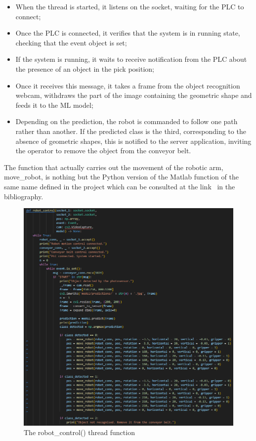 \documentclass[a4paper,11pt]{report}
\theoremstyle{definition}
\theoremstyle{plain}
\begin{document}
        \begin{itemize}
            \item When the thread is started, it listens on the socket, waiting for the PLC to connect;
            \item Once the PLC is connected, it verifies that the system is in running state, checking that the event object is set;
            \item If the system is running, it waits to receive notification from the PLC about the presence of an object in the pick position;
            \item Once it receives this message, it takes a frame from the object recognition webcam, withdraws the part of the image containing the geometric shape and feeds it to the ML model;
            \item Depending on the prediction, the robot is commanded to follow one path rather than another. If the predicted class is the third, corresponding to the absence of geometric shapes, this is notified to the server application, inviting the operator to remove the object from the conveyor belt.
        \end{itemize}
        The function that actually carries out the movement of the robotic arm, move\_robot, is nothing but the Python version of the Matlab function of the same name defined in the project which can be consulted at the link~\cite{matlab} in the bibliography.
        \begin{figure}[H]
        \includegraphics[scale=0.6]{images/robot control.png}
        \centering
        \caption{The robot\_control() thread function}
        \end{figure}
        
\end{document}
